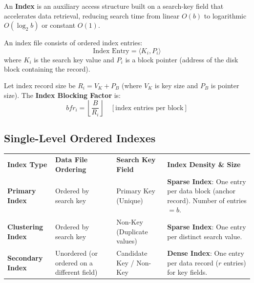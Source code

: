 \documentclass[11pt,a4paper]{article}
\begin{document}
An \textbf{Index} is an auxiliary access structure built on a search-key field that accelerates data retrieval, reducing search time from linear $O(b)$ to logarithmic $O(\log_2 b)$ or constant $O(1)$.

An index file consists of ordered index entries:
\begin{equation}
  \text{Index Entry} = \langle K_i, P_i \rangle
\end{equation}
where $K_i$ is the search key value and $P_i$ is a block pointer (address of the disk block containing the record).

Let index record size be $R_i = V_K + P_B$ (where $V_K$ is key size and $P_B$ is pointer size). The \textbf{Index Blocking Factor} is:
\begin{equation}
  bfr_i = \left\lfloor \frac{B}{R_i} \right\rfloor \quad [\text{index entries per block}]
\end{equation}

\subsection{Single-Level Ordered Indexes}

\begin{center}
\small
\begin{tabularx}{\textwidth}{L{2.8cm} L{3.5cm} L{3.2cm} X}
  \color{white}\textbf{Index Type} & \color{white}\textbf{Data File Ordering} & \color{white}\textbf{Search Key Field} & \color{white}\textbf{Index Density \& Size} \\
   \textbf{Primary Index} & Ordered by search key & Primary Key (Unique) & \textbf{Sparse Index}: One entry per data block (anchor record). Number of entries $= b$. \\
  \textbf{Clustering Index} & Ordered by search key & Non-Key (Duplicate values) & \textbf{Sparse Index}: One entry per distinct search value. \\
   \textbf{Secondary Index} & Unordered (or ordered on a different field) & Candidate Key / Non-Key & \textbf{Dense Index}: One entry per data record ($r$ entries) for key fields. \\
\end{tabularx}
\end{center}
\end{document}

